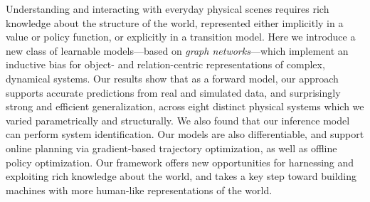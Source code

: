 Understanding and interacting with everyday physical scenes requires rich knowledge about the structure of the world, represented either implicitly in a value or policy function, or explicitly in a transition model. Here we introduce a new class of learnable models---based on \emph{graph networks}---which implement an inductive bias for object- and relation-centric representations of complex, dynamical systems. Our results show that as a forward model, our approach supports accurate predictions from real and simulated data, and surprisingly strong and efficient generalization, across eight distinct physical systems which we varied parametrically and structurally. We also found that our inference model can perform system identification. Our models are also differentiable, and support online planning via gradient-based trajectory optimization, as well as offline policy optimization. Our framework offers new opportunities for harnessing and exploiting rich knowledge about the world, and takes a key step toward building machines with more human-like representations of the world.